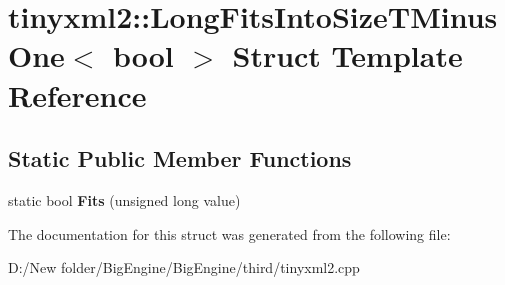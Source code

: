 \hypertarget{structtinyxml2_1_1_long_fits_into_size_t_minus_one}{}\section{tinyxml2\+:\+:Long\+Fits\+Into\+Size\+T\+Minus\+One$<$ bool $>$ Struct Template Reference}
\label{structtinyxml2_1_1_long_fits_into_size_t_minus_one}
\subsection*{Static Public Member Functions}
\begin{DoxyCompactItemize}
\item 
\mbox{\label{structtinyxml2_1_1_long_fits_into_size_t_minus_one_a3057710104ab733963eb32fda0bc374c}} 
static bool {\bfseries Fits} (unsigned long value)
\end{DoxyCompactItemize}


The documentation for this struct was generated from the following file\+:\begin{DoxyCompactItemize}
\item 
D\+:/\+New folder/\+Big\+Engine/\+Big\+Engine/third/tinyxml2.\+cpp\end{DoxyCompactItemize}
